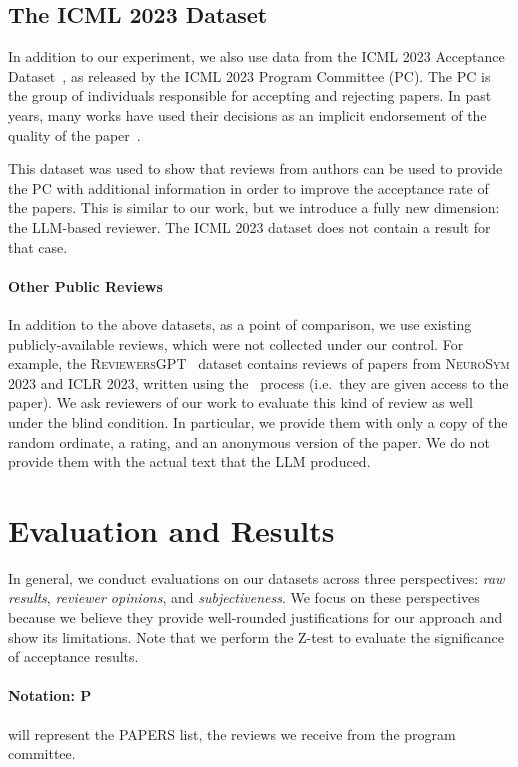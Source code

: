 \begin{minipage}[t]{\linewidth}
\subsection{The \textsc{ICML 2023} Dataset}
In addition to our experiment, we also use data from the \textsc{ICML 2023} Acceptance Dataset~\citep{su2024analysis}, as released by the \textsc{ICML 2023} Program Committee (PC). The PC is the group of individuals responsible for accepting and rejecting papers. In past years, many works have used their decisions as an implicit endorsement of the quality of the paper~\cite{DBLP:journals/corr/abs-1903-11367, huang2023makes}. 

This dataset was used to show that reviews from authors can be used to provide the PC with additional information in order to improve the acceptance rate of the papers. This is similar to our work, but we introduce a fully new dimension: the LLM-based reviewer. The \textsc{ICML 2023} dataset does not contain a result for that case.
\paragraph{Other Public Reviews}
In addition to the above datasets, as a point of comparison, we use existing publicly-available reviews, which were not collected under our control. For example, the \textsc{ReviewersGPT}~\citep{liu2023reviewergpt} dataset contains reviews of papers from \textsc{NeuroSym 2023} and \textsc{ICLR 2023}, written using the \singlellm\ process (i.e.\ they are given access to the paper). We ask reviewers of our work to evaluate this kind of review as well under the blind condition. In particular, we provide them with only a copy of the random ordinate, a rating, and an anonymous version of the paper. We do not provide them with the actual text that the LLM produced. 



\section{Evaluation and Results}

\label{sec:results}
In general, we conduct evaluations on our datasets across three perspectives: \textit{raw results}, \textit{reviewer opinions}, and \textit{subjectiveness}. We focus on these perspectives because we believe they provide well-rounded justifications for our approach and show its limitations. Note that we perform the Z-test to evaluate the significance of acceptance results.
\paragraph{Notation:
P}will represent the PAPERS list, the reviews we receive from the program committee.

\end{minipage}
